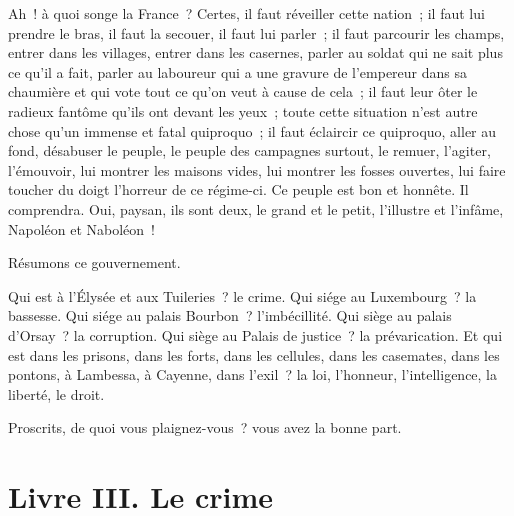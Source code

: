 \documentclass[french,twoside]{book} %
\newcommand\chapteropen{} %
\newcommand\chapterclose{} %
\begin{document}
Ah ! à quoi songe la France ? Certes, il faut réveiller cette nation ; il faut lui prendre le bras, il faut la secouer, il faut lui parler ; il faut parcourir les champs, entrer dans les villages, entrer dans les casernes, parler au soldat qui ne sait plus ce qu’il a fait, parler au laboureur qui a une gravure de l’empereur dans sa chaumière et qui vote tout ce qu’on veut à cause de cela ; il faut leur ôter le radieux fantôme qu’ils ont devant les yeux ; toute cette situation n’est autre chose qu’un immense et fatal quiproquo ; il faut éclaircir ce quiproquo, aller au fond, désabuser le peuple, le peuple des campagnes surtout, le remuer, l’agiter, l’émouvoir, lui montrer les maisons vides, lui montrer les fosses ouvertes, lui faire toucher du doigt l’horreur de ce régime-ci. Ce peuple est bon et honnête. Il comprendra. Oui, paysan, ils sont deux, le grand et le petit, l’illustre et l’infâme, Napoléon et Naboléon !\par
Résumons ce gouvernement.\par
Qui est à l’Élysée et aux Tuileries ? le crime. Qui siége au Luxembourg ? la bassesse. Qui siége au palais Bourbon ? l’imbécillité. Qui siège au palais d’Orsay ? la corruption. Qui siège au Palais de justice ? la prévarication. Et qui est dans les prisons, dans les forts, dans les cellules, dans les casemates, dans les pontons, à Lambessa, à Cayenne, dans l’exil ? la loi, l’honneur, l’intelligence, la liberté, le droit.\par
Proscrits, de quoi vous plaignez-vous ? vous avez la bonne part.
\chapterclose


\chapteropen

\chapter[{Livre III. Le crime}]{Livre III. Le crime}
\renewcommand{\leftmark}{Livre III. Le crime}
\end{document}
